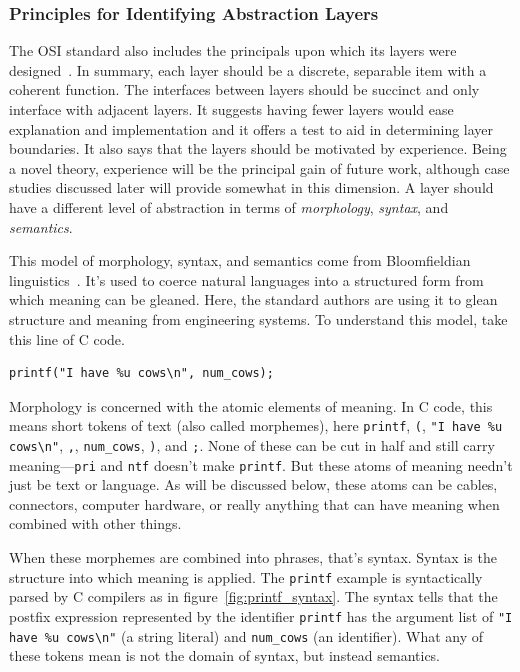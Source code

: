 \documentclass[english,12pt,a4paper,pdftex,eng,utf8]{aaltothesis}
\begin{document}
\subsubsection{Principles for Identifying Abstraction Layers}

The OSI standard also includes the principals upon which its layers were designed~\cite[§6.2.1]{ISO7498-1}.  In summary, each layer should be a discrete, separable item with a coherent function.  The interfaces between layers should be succinct and only interface with adjacent layers.  It suggests having fewer layers would ease explanation and implementation and it offers a test to aid in determining layer boundaries.  It also says that the layers should be motivated by experience.  Being a novel theory, experience will be the principal gain of future work, although case studies discussed later will provide somewhat in this dimension.  A layer should have a different level of abstraction in terms of {\it morphology}, {\it syntax}, and {\it semantics}.

This model of morphology, syntax, and semantics come from Bloomfieldian linguistics~\cite{Bloomfield1923}.  It's used to coerce natural languages into a structured form from which meaning can be gleaned.  Here, the standard authors are using it to glean structure and meaning from engineering systems.  To understand this model, take this line of C code.

\begin{verbatim}
printf("I have %u cows\n", num_cows);
\end{verbatim}

Morphology is concerned with the atomic elements of meaning.  In C code, this means short tokens of text (also called morphemes), here \verb|printf|, \verb|(|, \verb|"I have %u cows\n"|, \verb|,|, \verb|num_cows|, \verb|)|, and \verb|;|.  None of these can be cut in half and still carry meaning---\verb|pri| and \verb|ntf| doesn't make \verb|printf|.  But these atoms of meaning needn't just be text or language.  As will be discussed below, these atoms can be cables, connectors, computer hardware, or really anything that can have meaning when combined with other things.

When these morphemes are combined into phrases, that's syntax.  Syntax is the structure into which meaning is applied.  The \verb|printf| example is syntactically parsed by C compilers as in figure~\ref{fig:printf_syntax}.  The syntax tells that the postfix expression represented by the identifier \verb|printf| has the argument list of \verb|"I have %u cows\n"| (a string literal) and \verb|num_cows| (an identifier).  What any of these tokens mean is not the domain of syntax, but instead semantics.
\end{document}

